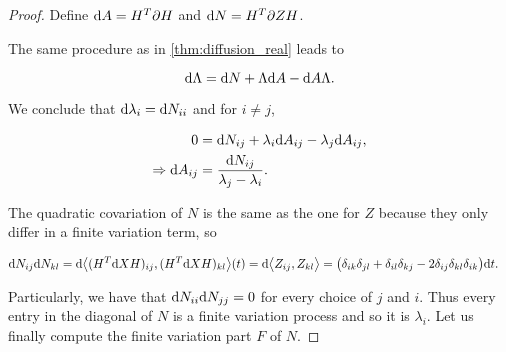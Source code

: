 \begin{proof}

Define $\mathrm d A = H^T\partial H$ and $\mathrm d N = H^T \partial Z H$.


The same procedure as in \ref{thm:diffusion_real} leads to 

\begin{equation*}
    \mathrm d \Lambda = \mathrm d N + \Lambda \mathrm d A - \mathrm d A \Lambda.
\end{equation*}

We conclude that $\mathrm d \lambda_i = \mathrm d N_{ii}$ and for $i\neq j$, 

\begin{align*}
    0 &= \mathrm d N_{ij} + \lambda_i \mathrm d A_{ij} - \lambda_j \mathrm d A_{ij},\\
    \Rightarrow \mathrm d A_{ij} &= \frac{\mathrm d N_{ij}}{\lambda_j - \lambda_i}.
\end{align*}

The quadratic covariation of $N$ is the same as the one for $Z$ because they only differ in a finite variation term, so

\begin{align*}
    \d N_{ij}\d N_{kl} &= \d \bigl< (\trans{H} \d X H)_{ij}, (\trans{H}\d X H)_{kl} \bigr>(t) %
    = \d \bigl< Z_{ij},Z_{kl} \bigr> = \bigl(\delta_{ik}\delta_{jl} + \delta_{il}\delta_{kj} - 2\delta_{ij}\delta_{kl}\delta_{ik} \bigr)\d t.
\end{align*}

Particularly, we have that $\mathrm d N_{ii}\mathrm d N_{jj} = 0$ for every choice of $j$ and $i$. Thus every entry in the diagonal of $N$ is a finite variation process and so it is $\lambda_i$. Let us finally compute the finite variation part $F$ of $N$.


\end{proof}

